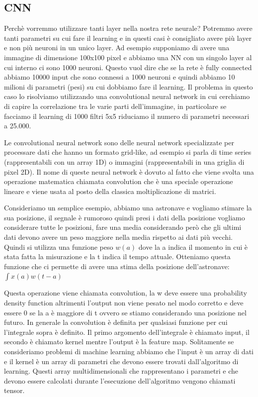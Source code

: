 \documentclass[14pt]{extreport}
\begin{document}
\subsection{CNN}

Perchè vorremmo utilizzare tanti layer nella nostra rete neurale? Potremmo avere tanti parametri su cui fare il learning e in questi casi è
consigliato avere più layer e non più neuroni in un unico layer. Ad esempio supponiamo di avere una immagine di dimensione 100x100 pixel e abbiamo una
NN con un singolo layer al cui interno ci sono 1000 neuroni. Questo vuol dire che se la rete è fully connected abbiamo 10000 input che sono connessi a
1000 neuroni e quindi abbiamo 10 milioni di parametri (pesi) su cui dobbiamo fare il learning. Il problema in questo caso lo risolviamo utilizzando
una convolutional neural network in cui cerchiamo di capire la correlazione tra le varie parti dell'immagine, in particolare se facciamo il learning
di 1000 filtri 5x5 riduciamo il numero di parametri necessari a 25.000.

Le convolutional neural network sono delle neural network specializzate per processare dati che hanno un formato grid-like, ad esempio si parla di
time series (rappresentabili con un array 1D) o immagini (rappresentabili in una griglia di pixel 2D). Il nome di queste neural network è dovuto al
fatto che viene svolta una operazione matematica chiamata convolution che è una speciale operazione lineare e viene usata al posto della classica
moltiplicazione di matrici.

Consideriamo un semplice esempio, abbiamo una astronave e vogliamo stimare la sua posizione, il segnale è rumoroso quindi presi i dati della posizione
vogliamo considerare tutte le posizioni, fare una media considerando però che gli ultimi dati devono avere un peso maggiore nella media rispetto ai
dati più vecchi. Quindi si utilizza una funzione peso $w(a)$ dove la a indica il momento in cui è stata fatta la misurazione e la t indica il tempo
attuale. Otteniamo questa funzione che ci permette di avere una stima della posizione dell'astronave: $\int x(a)w(t-a)$

Questa operazione viene chiamata convolution, la w deve essere una probability density function altrimenti l'output non viene pesato nel modo corretto
e deve essere 0 se la a è maggiore di t ovvero se stiamo considerando una posizione nel futuro. In generale la convolution è definita per qualsiasi
funzione per cui l'integrale sopra è definito. Il primo argomento dell'integrale è chiamato input, il secondo è chiamato kernel mentre l'output è la
feature map. Solitamente se consideriamo problemi di machine learning abbiamo che l'input è un array di dati e il kernel è un array di parametri che
devono essere trovati dall'algoritmo di learning. Questi array multidimensionali che rappresentano i parametri e che devono essere calcolati durante
l'esecuzione dell'algoritmo vengono chiamati tensor.
\end{document}
